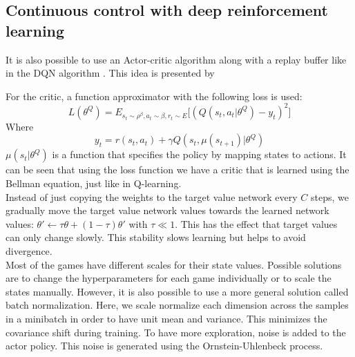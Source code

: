 \documentclass[a4paper]{article}
\begin{document}
\subsection{Continuous control with deep reinforcement learning}
It is also possible to use an Actor-critic algorithm along with a replay buffer like in the DQN algorithm \citep{Mnih2015Human-levelLearning}. This idea is presented by \cite{Lillicrap2015ContinuousLearning}

For the critic, a function approximator with the following loss is used:
\begin{equation}
L(\theta^Q) = E_{s_t \sim \rho^{\beta}, a_t \sim \beta, r_t \sim E} \big [ (Q(s_t, a_t \vert \theta^Q) - y_t)^2 \big ]
\end{equation}
Where
\begin{equation}
y_t = r(s_t,a_t) + \gamma Q(s_t, \mu(s_{t+1}) \vert \theta^Q)
\end{equation}
$\mu(s_t \vert \theta^Q)$ is a function that specifies the policy by mapping states to actions.
It can be seen that using the loss function we have a critic that is learned using the Bellman equation, just like in Q-learning.\\

Instead of just copying the weights to the target value network every $C$ steps, we gradually move the target value network values towards the learned network values: $\theta' \leftarrow \tau \theta + (1-\tau) \theta'$ with $\tau \ll 1$. This has the effect that target values can only change slowly. This stability slows learning but helps to avoid divergence.\\

Most of the games have different scales for their state values. Possible solutions are to change the hyperparameters for each game individually or to scale the states manually. However, it is also possible to use a more general solution called batch normalization. Here, we scale normalize each dimension across the samples in a minibatch in order to have unit mean and variance. This minimizes the covariance shift during training.
To have more exploration, noise is added to the actor policy. This noise is generated using the Ornstein-Uhlenbeck process.
\end{document}
